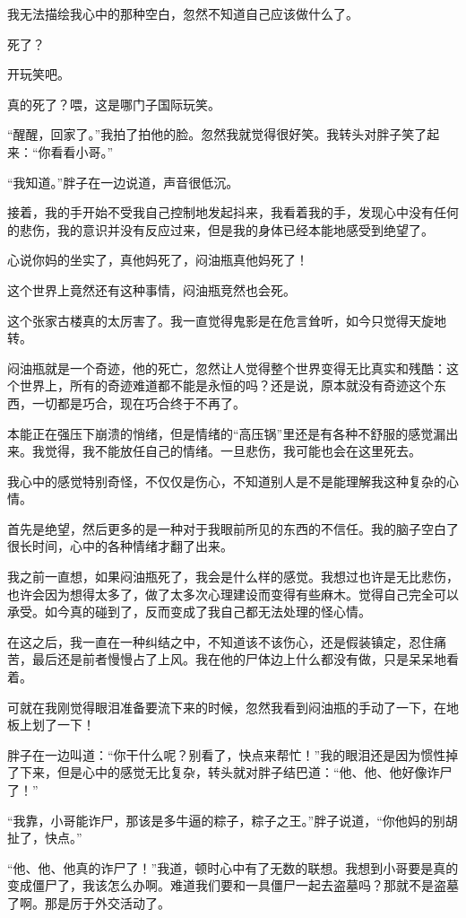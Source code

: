 我无法描绘我心中的那种空白，忽然不知道自己应该做什么了。

死了？

开玩笑吧。

真的死了？喂，这是哪门子国际玩笑。

“醒醒，回家了。”我拍了拍他的脸。忽然我就觉得很好笑。我转头对胖子笑了起来：“你看看小哥。”

“我知道。”胖子在一边说道，声音很低沉。

接着，我的手开始不受我自己控制地发起抖来，我看着我的手，发现心中没有任何的悲伤，我的意识并没有反应过来，但是我的身体已经本能地感受到绝望了。

心说你妈的坐实了，真他妈死了，闷油瓶真他妈死了！

这个世界上竟然还有这种事情，闷油瓶竞然也会死。

这个张家古楼真的太厉害了。我一直觉得鬼影是在危言耸听，如今只觉得天旋地转。

闷油瓶就是一个奇迹，他的死亡，忽然让人觉得整个世界变得无比真实和残酷：这个世界上，所有的奇迹难道都不能是永恒的吗？还是说，原本就没有奇迹这个东西，一切都是巧合，现在巧合终于不再了。

本能正在强压下崩溃的悄绪，但是情绪的“高压锅”里还是有各种不舒服的感觉漏出来。我觉得，我不能放任自己的情绪。一旦悲伤，我可能也会在这里死去。

我心中的感觉特别奇怪，不仅仅是伤心，不知道别人是不是能理解我这种复杂的心情。

首先是绝望，然后更多的是一种对于我眼前所见的东西的不信任。我的脑子空白了很长时间，心中的各种情绪才翻了出来。

我之前一直想，如果闷油瓶死了，我会是什么样的感觉。我想过也许是无比悲伤，也许会因为想得太多了，做了太多次心理建设而变得有些麻木。觉得自己完全可以承受。如今真的碰到了，反而变成了我自己都无法处理的怪心情。

在这之后，我一直在一种纠结之中，不知道该不该伤心，还是假装镇定，忍住痛苦，最后还是前者慢慢占了上风。我在他的尸体边上什么都没有做，只是呆呆地看着。

可就在我刚觉得眼泪准备要流下来的时候，忽然我看到闷油瓶的手动了一下，在地板上划了一下！

胖子在一边叫道：“你干什么呢？别看了，快点来帮忙！”我的眼泪还是因为惯性掉了下来，但是心中的感觉无比复杂，转头就对胖子结巴道：“他、他、他好像诈尸了！”

“我靠，小哥能诈尸，那该是多牛逼的粽子，粽子之王。”胖子说道，“你他妈的别胡扯了，快点。”

“他、他、他真的诈尸了！”我道，顿时心中有了无数的联想。我想到小哥要是真的变成僵尸了，我该怎么办啊。难道我们要和一具僵尸一起去盗墓吗？那就不是盗墓了啊。那是厉于外交活动了。

